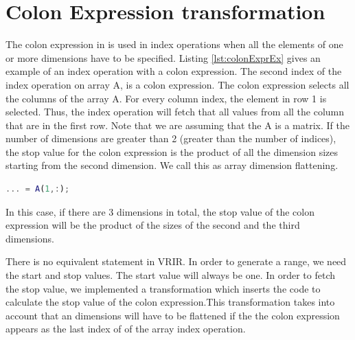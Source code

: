 \section{Colon Expression transformation}
\label{sec:colonExpr}
The colon expression in \matlab is used in index operations when all the elements of one or more dimensions have to be specified. Listing \ref{lst:colonExprEx} gives an example of an index operation with a colon expression. The second index of the index operation on array A, is a colon expression. The colon expression selects all the columns of the array A. For every column index, the element in row 1 is selected. Thus, the index operation will fetch that all values from all the column that are in the first row. Note that we are assuming that the A is a matrix. If the number of dimensions are greater than 2 (greater than the number of indices), the stop value for the colon expression is the product of all the dimension sizes starting from the second dimension. We call this as array dimension flattening. 
\begin{lstlisting}[language=matlab, label={lst:colonExprEx}, caption={An example of the an array index operation with a colon expression as an index. }]
... = A(1,:);
\end{lstlisting}
In this case, if there are 3 dimensions in total, the stop value of the colon expression will be the product of the sizes of the second and the third dimensions. 

There is no equivalent statement in VRIR. In order to generate a range, we need the start and stop values. The start value will always be one. In order to fetch the stop value, we implemented a transformation which inserts the code to calculate the stop value of the colon expression.This transformation takes into account that an dimensions will have to be flattened if the the colon expression appears as the last index of of the array index operation. 

